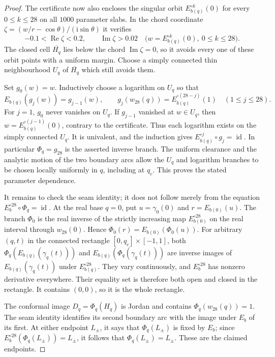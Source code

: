 \documentclass[11pt,a4paper]{article}
\theoremstyle{definition}
\newcommand{\ii}{\mathrm{i}}
\begin{document}
\begin{proof}
The certificate  now also
encloses the singular orbit $E_{b(q)}^{\circ k}(0)$ for every
$0\le k\le28$ on all $1000$ parameter slabs.  In the chord
coordinate $\zeta=(w/r-\cos\theta)/(\ii\sin\theta)$ it verifies
\[
 -0.1<\operatorname{Re}\zeta<0.2,\qquad
 \operatorname{Im}\zeta>0.02
 \quad\bigl(w=E_{b(q)}^{\circ k}(0),\ 0\le k\le28\bigr).
\]
The closed cell $\overline{H_q}$ lies below the chord
$\operatorname{Im}\zeta=0$, so it avoids every one of these orbit
points with a uniform margin.  Choose a simply connected thin
neighbourhood $U_q$ of $\overline{H_q}$ which still avoids them.

Set $g_0(w)=w$.  Inductively choose a logarithm on $U_q$ so that
\[
 E_{b(q)}(g_j(w))=g_{j-1}(w),\qquad
 g_j(w_{28}(q))=E_{b(q)}^{\circ(28-j)}(1)
 \quad(1\le j\le28).
\]
For $j=1$, $g_0$ never vanishes on $U_q$.  If $g_{j-1}$ vanished at
$w\in U_q$, then $w=E_{b(q)}^{\circ(j-1)}(0)$, contrary to the
certificate.  Thus each logarithm exists on the simply connected
$U_q$.  It is univalent, and the induction gives
$E_{b(q)}^{\circ j}\circ g_j=\operatorname{id}$.  In particular
$\Phi_q=g_{28}$ is the asserted inverse branch.  The uniform
clearance and the analytic motion of the two boundary arcs allow the
$U_q$ and logarithm branches to be chosen locally uniformly in $q$,
including at $q_c$.  This proves the stated parameter dependence.

It remains to check the seam identity; it does not follow merely from
the equation $E_b^{\circ28}\circ\Phi_q=\operatorname{id}$.  At the
real base $q=0$, put $u=\gamma_0(0)$ and $r=E_{b(0)}(u)$.
The branch $\Phi_0$ is the real inverse of the strictly increasing
map $E_{b(0)}^{\circ28}$ on the real interval through $w_{28}(0)$.
Hence $\Phi_0(r)=E_{b(0)}(\Phi_0(u))$.
For arbitrary $(q,t)$ in the connected rectangle
$[0,q_c]\times[-1,1]$, both
$\Phi_q(E_{b(q)}(\gamma_q(t)))$ and
$E_{b(q)}(\Phi_q(\gamma_q(t)))$ are inverse images of
$E_{b(q)}(\gamma_q(t))$ under $E_{b(q)}^{\circ28}$.
They vary continuously, and $E_b^{\circ28}$ has nonzero derivative
everywhere.  Their equality set is therefore both open and closed
in the rectangle.  It contains $(0,0)$, so it is the whole rectangle.

The conformal image $D_q=\Phi_q(H_q)$ is Jordan and contains
$\Phi_q(w_{28}(q))=1$.  The seam identity identifies its second
boundary arc with the image under $E_b$ of its first.  At either
endpoint $L_\pm$, it says that $\Phi_q(L_\pm)$ is fixed by $E_b$;
since $E_b^{\circ28}(\Phi_q(L_\pm))=L_\pm$, it follows that
$\Phi_q(L_\pm)=L_\pm$.  These are the claimed endpoints.
\end{proof}
\end{document}
